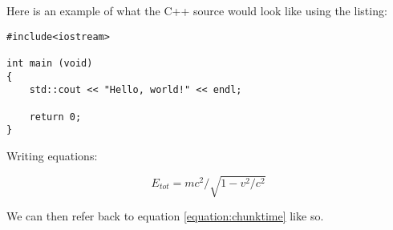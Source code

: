 \documentclass[12pt,a4paper]{article}
\begin{document}
\maketitle
\newpage


\tableofcontents
\newpage


Here is an example of what the C++ source would look like using the listing: 
 
\begin{lstlisting}
#include<iostream> 

int main (void)
{
	std::cout << "Hello, world!" << endl;

	return 0; 
}
\end{lstlisting}

Writing equations:  

\begin{equation} 
E_{tot} = m c^2 / \sqrt{1 - {v^2/c^2}}
\label{equation:chunktime}
\end{equation}

We can then refer back to equation \ref{equation:chunktime} like so. 














\end{document}
